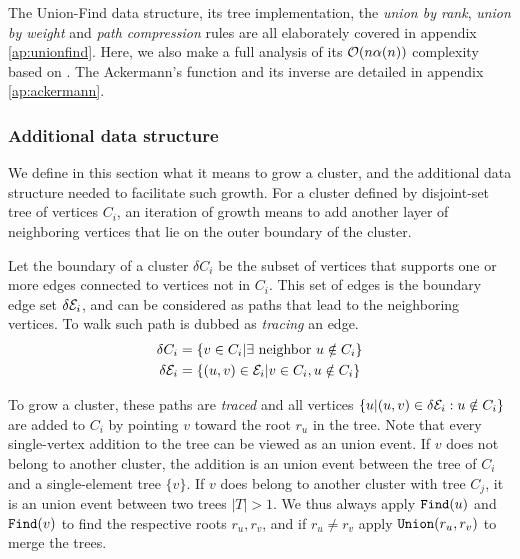 The Union-Find data structure, its tree implementation, the \emph{union by rank}, \emph{union by weight} and \emph{path compression} rules are all elaborately covered in appendix \ref{ap:unionfind}. Here, we also make a full analysis of its $\mathcal{O}(n\alpha(n))$ complexity based on \cite{kozen1992design}. The Ackermann's function and its inverse are detailed in appendix \ref{ap:ackermann}.

\subsubsection{Additional data structure}
We define in this section what it means to grow a cluster, and the additional data structure needed to facilitate such growth. For a cluster defined by disjoint-set tree of vertices $C_i$, an iteration of growth means to add another layer of neighboring vertices that lie on the outer boundary of the cluster. 
\begin{definition}\label{def:clusterboud}
  Let the boundary of a cluster $\delta C_i$ be the subset of vertices that supports one or more edges connected to vertices not in $C_i$. This set of edges is the boundary edge set $\delta \mathcal{E}_i$, and can be considered as paths that lead to the neighboring vertices. To walk such path is dubbed as \emph{tracing} an edge. 
  \begin{align}
    \delta C_i&= \left\{ v \in C_i | \exists \text{ neighbor }  u \notin C_i \right\} \\
    \delta \mathcal{E}_i &= \{(u,v)\in \mathcal{E}_i | v \in C_i, u \notin C_i \}
  \end{align}
\end{definition}
To grow a cluster, these paths are \emph{traced} and all vertices $\{u | (u,v) \in \delta \mathcal{E}_i: u \notin C_i\}$ are added to $C_i$ by pointing $v$ toward the root $r_u$ in the tree. Note that every single-vertex addition to the tree can be viewed as an union event. If $v$ does not belong to another cluster, the addition is an union event between the tree of $C_i$ and a single-element tree $\{v\}$. If $v$ does belong to another cluster with tree $C_j$, it is an union event between two trees $|T|>1$. We thus always apply $\texttt{Find}(u)$ and $\texttt{Find}(v)$ to find the respective roots $r_u, r_v$, and if $r_u\neq r_v$ apply $\texttt{Union}(r_u, r_v)$ to merge the trees.

